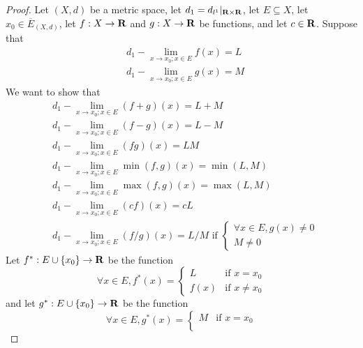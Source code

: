 \begin{proof}
    Let \((X, d)\) be a metric space, let \(d_1 = d_{l^1}|_{\mathbf{R} \times \mathbf{R}}\), let \(E \subseteq X\), let \(x_0 \in \overline{E}_{(X, d)}\), let \(f : X \to \mathbf{R}\) and \(g : X \to \mathbf{R}\) be functions, and let \(c \in \mathbf{R}\).
    Suppose that
    \begin{align*}
         & d_1 - \lim_{x \to x_0 ; x \in E} f(x) = L \\
         & d_1 - \lim_{x \to x_0 ; x \in E} g(x) = M
    \end{align*}
    We want to show that
    \begin{align*}
         & d_1 - \lim_{x \to x_0 ; x \in E} (f + g)(x) = L + M                                          \\
         & d_1 - \lim_{x \to x_0 ; x \in E} (f - g)(x) = L - M                                          \\
         & d_1 - \lim_{x \to x_0 ; x \in E} (fg)(x) = LM                                                \\
         & d_1 - \lim_{x \to x_0 ; x \in E} \min(f, g)(x) = \min(L, M)                                  \\
         & d_1 - \lim_{x \to x_0 ; x \in E} \max(f, g)(x) = \max(L, M)                                  \\
         & d_1 - \lim_{x \to x_0 ; x \in E} (cf)(x) = cL                                                \\
         & d_1 - \lim_{x \to x_0 ; x \in E} (f / g)(x) = L / M \text{ if } \begin{cases}
                                                                               \forall x \in E, g(x) \neq 0 \\
                                                                               M \neq 0
                                                                           \end{cases}
    \end{align*}
    Let \(f^* : E \cup \{x_0\} \to \mathbf{R}\) be the function
    \[
        \forall x \in E, f^*(x) = \begin{cases}
            L    & \text{if } x = x_0    \\
            f(x) & \text{if } x \neq x_0
        \end{cases}
    \]
    and let \(g^* : E \cup \{x_0\} \to \mathbf{R}\) be the function
    \[
        \forall x \in E, g^*(x) = \begin{cases}
            M    & \text{if } x = x_0    \\

\end{cases}\]
\end{proof}
